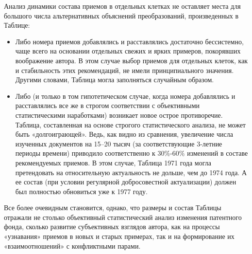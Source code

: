 \documentclass[11pt,a4paper]{article}
\begin{document}
Анализ динамики состава приемов в отдельных клетках не оставляет места для
большого числа альтернативных объяснений преобразований, произведенных в
Таблице:
\begin{itemize}
\item Либо номера приемов добавлялись и расставлялись достаточно бессистемно,
  чаще всего на основании отдельных свежих и ярких примеров, покорявших
  воображение автора. В этом случае выбор приемов для отдельных клеток, как и
  стабильность этих рекомендаций, не имели принципиального значения. Другими
  словами, Таблица могла заполняться случайным образом.
\item Либо (и только в том гипотетическом случае, когда номера добавлялись и
  расставлялись все же в строгом соответствии с объективными статистическими
  наработками) возникает новое острое противоречие. Таблица, составленная на
  основе строгого статистического анализа, не может быть «долгоиграющей».
  Ведь, как видно из сравнения, увеличение числа изученных документов на
  15--20 тысяч (за соответствующие 3-летние периоды времени) приводило
  соответственно к 30\%-60\% изменений в составе рекомендуемых приемов. В этом
  случае, Таблица 1971 года могла претендовать на относительную актуальность
  не дольше, чем до 1974 года. А ее состав (при условии регулярной
  добросовестной актуализации) должен был полностью обновиться уже к 1977
  году.
\end{itemize}

Все более очевидным становится, однако, что размеры и состав Таблицы отражали
не столько объективный статистический анализ изменения патентного фонда,
сколько развитие субъективных взглядов автора, как на процессы «узнавания»
приемов в новых и старых примерах, так и на формирование их «взаимоотношений»
с конфликтными парами.


\end{document}

